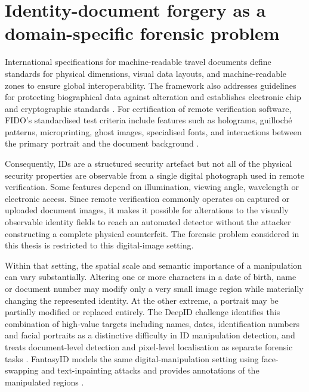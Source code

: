 
\section{Identity-document forgery as a domain-specific forensic problem} \label{sec:lr-context} 

International specifications for machine-readable travel documents define standards for physical dimensions, visual data layouts, and machine-readable zones to ensure global interoperability. The framework also addresses guidelines for protecting biographical data against alteration and establishes electronic chip and cryptographic standards \citep{icao9303}. For certification of remote verification software, FIDO's standardised test criteria include features such as holograms, guilloché patterns, microprinting, ghost images, specialised fonts, and interactions between the primary portrait and the document background \citep{fido2026docauth}. 

Consequently, IDs are a structured security artefact but not all of the physical security properties are observable from a single digital photograph used in remote verification. Some features depend on illumination, viewing angle, wavelength or electronic access. Since remote verification commonly operates on captured or uploaded document images, it makes it possible for alterations to the visually observable identity fields to reach an automated detector without the attacker constructing a complete physical counterfeit. The forensic problem considered in this thesis is restricted to this digital-image setting. 

Within that setting, the spatial scale and semantic importance of a manipulation can vary substantially. Altering one or more characters in a date of birth, name or document number may modify only a very small image region while materially changing the represented identity. At the other extreme, a portrait may be partially modified or replaced entirely. The DeepID challenge identifies this combination of high-value targets including names, dates, identification numbers and facial portraits as a distinctive difficulty in ID manipulation detection, and treats document-level detection and pixel-level localisation as separate forensic tasks \citep{korshunov2025deepid}. FantasyID models the same digital-manipulation setting using face-swapping and text-inpainting attacks and provides annotations of the manipulated regions \citep{korshunov2025fantasyid}. 

